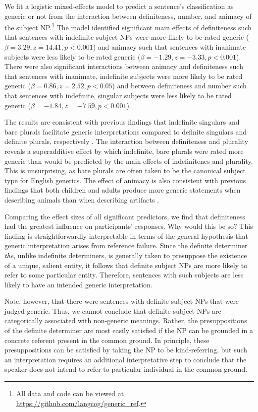 \documentclass[10pt,letterpaper]{article}
\begin{document}
We fit a logistic mixed-effects model to predict a sentence's classification as generic or not from the interaction between definiteness, number, and animacy of the subject NP.\footnote{All data and code can be viewed at \url{https://github.com/langcog/generic_ref}.} The model identified significant main effects of definiteness such that sentences with indefinite subject NPs were more likely to be rated generic (\(\beta = 3.29, z = 14.41, p < 0.001\)) and animacy such that sentences with inanimate subjects were less likely to be rated generic (\(\beta = -1.29, z = -3.33, p < 0.001\)). There were also significant interactions between animacy and definiteness such that sentences with inanimate, indefinite subjects were more likely to be rated generic (\(\beta = 0.86, z = 2.52, p < 0.05\)) and between definiteness and number such that sentences with indefinite, singular subjects were less likely to be rated generic (\(\beta = -1.84, z = -7.59, p < 0.001\)).

The results are consistent with previous findings that indefinite singulars and bare plurals facilitate generic interpretations compared to definite singulars and definite plurals, respectively \cite{Cimpian:2011, Gelman:2003}. The interaction between definiteness and plurality reveals a superadditive effect by which indefinite, bare plurals were rated more generic than would be predicted by the main effects of indefinitenes and plurality. This is unsurprising, as bare plurals are often taken to be the canonical subject type for English generics. The effect of animacy is also consistent with previous findings that both children and adults produce more generic statements when describing animals than when describing artifacts \cite{Brandone:2009}.

Comparing the effect sizes of all significant predictors, we find that definiteness had the greatest influence on participants' responses. Why would this be so? This finding is straightforwardly interpretable in terms of the general hypothesis that generic interpretation arises from reference failure. Since the definite determiner \textit{the}, unlike indefinite determiners, is generally taken to presuppose the existence of a unique, salient entity, it follows that definite subject NPs are more likely to refer to some particular entity. Therefore, sentences with such subjects are less likely to have an intended generic interpretation.

Note, however, that there were sentences with definite subject NPs that were judged generic. Thus, we cannot conclude that definite subject NPs are categorically associated with non-generic meanings. Rather, the presuppositions of the definite determiner are most easily satisfied if the NP can be grounded in a concrete referent present in the common ground. In principle, these presuppositions can be satisfied by taking the NP to be kind-referring, but such an interpretation requires an additional interpretative step to conclude that the speaker does not intend to refer to particular individual in the common ground.
\end{document}
